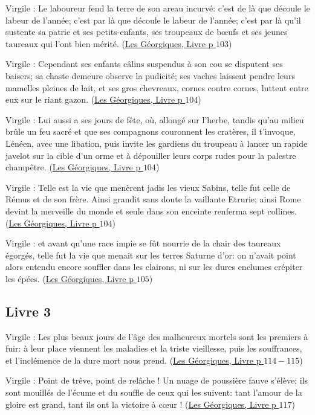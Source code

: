\documentclass[a4paper, 11pt, hidelinks]{article}
\newcommand{\bs}{\bigskip}
\newcommand{\rb}[1]{\Romanbar{#1}}
\newcommand{\citer}[3]{\bs \begin{center} \textcolor{authorGray}{#1 :} \textcolor{citationRed}{\og #2 \fg} \textcolor{authorGray}{(\underline{#3})} \end{center} \bs}
\begin{document}
\citer{Virgile}{Le laboureur fend la terre de son areau incurvé: c'est de là que découle le labeur de l'année; c'est par là que découle
le labeur de l'année; c'est par là qu'il sustente sa patrie et ses petits-enfants, ses troupeaux de b\oe ufs et ses jeunes taureaux
qui l'ont bien mérité.}{Les Géorgiques, Livre \rb{2} p $103$}


\citer{Virgile}{Cependant ses enfants câlins suspendus à son cou se disputent ses baisers; sa chaste demeure observe la pudicité;
ses vaches laissent pendre leurs mamelles pleines de lait, et ses gros chevreaux, cornes contre cornes, luttent entre eux sur le
riant gazon.}{Les Géorgiques, Livre \rb{2} p $104$}


\citer{Virgile}{Lui aussi a ses jours de fête, où, allongé sur l'herbe, tandis qu'au milieu brûle un feu sacré et que ses compagnons
couronnent les cratères, il t'invoque, Lénéen, avec une libation, puis invite les gardiens du troupeau à lancer un rapide javelot sur 
la cible d'un orme et à dépouiller leurs corps rudes pour la palestre champêtre.}{Les Géorgiques, Livre \rb{2} p $104$}


\citer{Virgile}{Telle est la vie que menèrent jadis les vieux Sabins, telle fut celle de Rémus et de son frère. Ainsi grandit sans 
doute la vaillante Etrurie; ainsi Rome devint la merveille du monde et seule dans son enceinte renferma sept collines.}{Les Géorgiques, Livre \rb{2} p $104$}


\citer{Virgile}{et avant qu'une race impie se fût nourrie de la chair des taureaux égorgés, telle fut la vie que menait sur les terres
Saturne d'or: on n'avait point alors entendu encore souffler dans les clairons, ni sur les dures enclumes crépiter les épées.}{Les Géorgiques, Livre \rb{2} p $105$}



\subsection{Livre 3}


\citer{Virgile}{Les plus beaux jours de l'âge des malheureux mortels sont les premiers à fuir: à leur place viennent les maladies
et la triste vieillesse, puis les souffrances, et l'inclémence de la dure mort nous prend.}{Les Géorgiques, Livre \rb{3} p $114-115$}


\citer{Virgile}{Point de trêve, point de relâche ! Un nuage de poussière fauve s'élève; ils sont mouillés de l'écume et du souffle de 
ceux qui les suivent: tant l'amour de la gloire est grand, tant ils ont la victoire à c\oe ur !}{Les Géorgiques, Livre \rb{3} p $117$}
\end{document}
